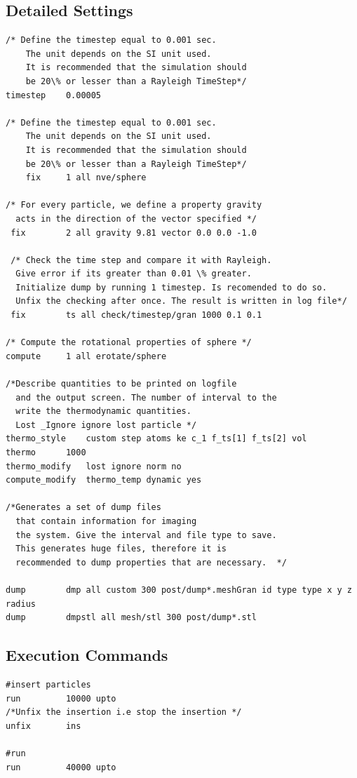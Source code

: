 \documentclass{tufte-book} %
\begin{document}
\subsection{Detailed Settings}
\begin{verbatim}
/* Define the timestep equal to 0.001 sec.
    The unit depends on the SI unit used.
    It is recommended that the simulation should
    be 20\% or lesser than a Rayleigh TimeStep*/  
timestep	0.00005

/* Define the timestep equal to 0.001 sec.
    The unit depends on the SI unit used.
    It is recommended that the simulation should
    be 20\% or lesser than a Rayleigh TimeStep*/
    fix		1 all nve/sphere

/* For every particle, we define a property gravity
  acts in the direction of the vector specified */
 fix		2 all gravity 9.81 vector 0.0 0.0 -1.0

 /* Check the time step and compare it with Rayleigh.
  Give error if its greater than 0.01 \% greater.
  Initialize dump by running 1 timestep. Is recomended to do so.
  Unfix the checking after once. The result is written in log file*/
 fix		ts all check/timestep/gran 1000 0.1 0.1

/* Compute the rotational properties of sphere */
compute		1 all erotate/sphere

/*Describe quantities to be printed on logfile
  and the output screen. The number of interval to the
  write the thermodynamic quantities.
  Lost _Ignore ignore lost particle */
thermo_style	custom step atoms ke c_1 f_ts[1] f_ts[2] vol
thermo		1000
thermo_modify	lost ignore norm no
compute_modify	thermo_temp dynamic yes

/*Generates a set of dump files
  that contain information for imaging
  the system. Give the interval and file type to save.
  This generates huge files, therefore it is
  recommended to dump properties that are necessary.  */
  
dump		dmp all custom 300 post/dump*.meshGran id type type x y z  radius
dump 		dmpstl all mesh/stl 300 post/dump*.stl

\end{verbatim}
\vspace*{5ex}
\subsection{Execution Commands}

\begin{verbatim}
#insert particles
run			10000 upto
/*Unfix the insertion i.e stop the insertion */
unfix		ins

#run
run			40000 upto

  \end{verbatim}
\end{document}
